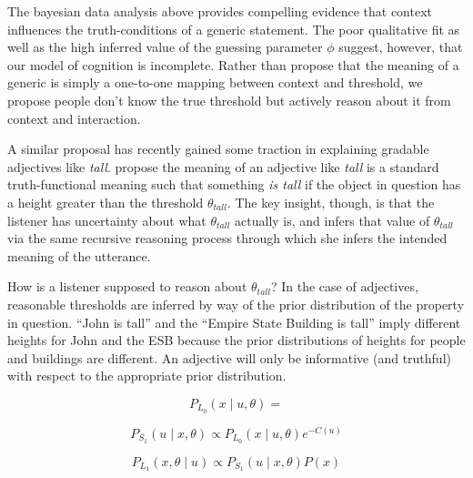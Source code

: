 \documentclass[10pt,letterpaper]{article}
\begin{document}

The bayesian data analysis above provides compelling evidence that context influences the truth-conditions of a generic statement. The poor qualitative fit as well as the high inferred value of the guessing parameter $\phi$ suggest, however, that our model of cognition is incomplete. Rather than propose that the meaning of a generic is simply a one-to-one mapping between context and threshold, we propose people don't know the true threshold but actively reason about it from context and interaction. 

A similar proposal has recently gained some traction in explaining gradable adjectives like \emph{tall}.   propose the meaning of an adjective like \emph{tall} is a standard truth-functional meaning such that something \emph{is tall} if the object in question has a height greater than the threshold $\theta_{tall}$. The key insight, though, is that the listener has uncertainty about what $\theta_{tall}$ actually is, and infers that value of $\theta_{tall}$ via the same recursive reasoning process through which she infers the intended meaning of the utterance.

How is a listener supposed to reason about $\theta_{tall}$? In the case of adjectives, reasonable thresholds are inferred by way of the prior distribution of the property in question. ``John is tall'' and the ``Empire State Building is tall'' imply different heights for John and the ESB because the prior distributions of heights for people and buildings are different. An adjective will only be informative (and truthful) with respect to the appropriate prior distribution. 


$$ P_{L_{0}}(x \mid u, \theta)= $$

$$ P_{S_{1}}(u \mid x, \theta) \propto P_{L_{0}}(x \mid u, \theta) e^{-C(u)} $$

$$ P_{L_{1}}(x , \theta \mid u) \propto P_{S_{1}}(u \mid x, \theta) P(x) $$



%
%			
%			
%			
%			
%			
%			
%			
\end{document}
